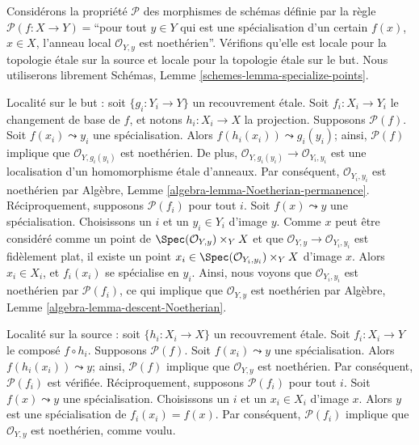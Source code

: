 \begin{example}
\label{example-silly-two}
Considérons la propriété $\mathcal{P}$ des morphismes de schémas définie par
la règle $\mathcal{P}(f : X \to Y) = $``pour tout $y \in Y$ qui est une
spécialisation d'un certain $f(x)$, $x \in X$, l'anneau local
$\mathcal{O}_{Y, y}$ est noethérien''.
Vérifions qu'elle est locale pour la topologie \'etale sur la source et
locale pour la topologie \'etale sur le but. Nous utiliserons librement
Schémas, Lemme \ref{schemes-lemma-specialize-points}.

\medskip\noindent
Localité sur le but : soit $\{g_i : Y_i \to Y\}$ un recouvrement \'etale.
Soit $f_i : X_i \to Y_i$ le changement de base de $f$, et notons
$h_i : X_i \to X$ la projection. Supposons $\mathcal{P}(f)$.
Soit $f(x_i) \leadsto y_i$ une spécialisation.
Alors $f(h_i(x_i)) \leadsto g_i(y_i)$; ainsi, $\mathcal{P}(f)$ implique que
$\mathcal{O}_{Y, g_i(y_i)}$ est noethérien.
De plus, $\mathcal{O}_{Y, g_i(y_i)} \to \mathcal{O}_{Y_i, y_i}$ est une
localisation d'un homomorphisme \'etale d'anneaux.
Par conséquent, $\mathcal{O}_{Y_i, y_i}$ est noethérien par
Algèbre, Lemme \ref{algebra-lemma-Noetherian-permanence}.
Réciproquement, supposons $\mathcal{P}(f_i)$ pour tout $i$.
Soit $f(x) \leadsto y$ une spécialisation. Choisissons un $i$ et un
$y_i \in Y_i$ d'image $y$.
Comme $x$ peut être considéré comme un point de
$\Spec(\mathcal{O}_{Y, y}) \times_Y X$ et que
$\mathcal{O}_{Y, y} \to \mathcal{O}_{Y_i, y_i}$ est fidèlement plat,
il existe un point
$x_i \in \Spec(\mathcal{O}_{Y_i, y_i}) \times_Y X$
d'image $x$. Alors $x_i \in X_i$, et $f_i(x_i)$ se spécialise en $y_i$.
Ainsi, nous voyons que $\mathcal{O}_{Y_i, y_i}$ est noethérien par
$\mathcal{P}(f_i)$, ce qui implique que $\mathcal{O}_{Y, y}$ est noethérien par
Algèbre, Lemme \ref{algebra-lemma-descent-Noetherian}.

\medskip\noindent
Localité sur la source : soit $\{h_i : X_i \to X\}$ un recouvrement \'etale.
Soit $f_i : X_i \to Y$ le composé $f \circ h_i$.
Supposons $\mathcal{P}(f)$. Soit $f(x_i) \leadsto y$ une spécialisation.
Alors $f(h_i(x_i)) \leadsto y$; ainsi, $\mathcal{P}(f)$ implique que
$\mathcal{O}_{Y, y}$ est noethérien. Par conséquent, $\mathcal{P}(f_i)$ est
vérifiée. Réciproquement, supposons $\mathcal{P}(f_i)$ pour tout $i$.
Soit $f(x) \leadsto y$ une spécialisation. Choisissons un $i$ et un
$x_i \in X_i$ d'image $x$.
Alors $y$ est une spécialisation de $f_i(x_i) = f(x)$.
Par conséquent, $\mathcal{P}(f_i)$ implique que $\mathcal{O}_{Y, y}$ est
noethérien, comme voulu.


\end{example}
